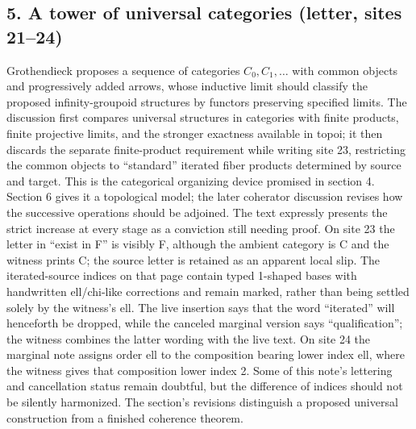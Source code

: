 \subsection*{5. A tower of universal categories (letter, sites 21--24)}
Grothendieck proposes a sequence of categories $C_0,C_1,\ldots$ with common objects and progressively added arrows, whose inductive limit should classify the proposed infinity-groupoid structures by functors preserving specified limits. The discussion first compares universal structures in categories with finite products, finite projective limits, and the stronger exactness available in topoi; it then discards the separate finite-product requirement while writing site 23, restricting the common objects to ``standard'' iterated fiber products determined by source and target. This is the categorical organizing device promised in section 4. Section 6 gives it a topological model; the later coherator discussion revises how the successive operations should be adjoined. The text expressly presents the strict increase at every stage as a conviction still needing proof. On site 23 the letter in ``exist in F'' is visibly F, although the ambient category is C and the witness prints C; the source letter is retained as an apparent local slip. The iterated-source indices on that page contain typed 1-shaped bases with handwritten ell/chi-like corrections and remain marked, rather than being settled solely by the witness's ell. The live insertion says that the word ``iterated'' will henceforth be dropped, while the canceled marginal version says ``qualification''; the witness combines the latter wording with the live text. On site 24 the marginal note assigns order ell to the composition bearing lower index ell, where the witness gives that composition lower index 2. Some of this note's lettering and cancellation status remain doubtful, but the difference of indices should not be silently harmonized. The section's revisions distinguish a proposed universal construction from a finished coherence theorem.

